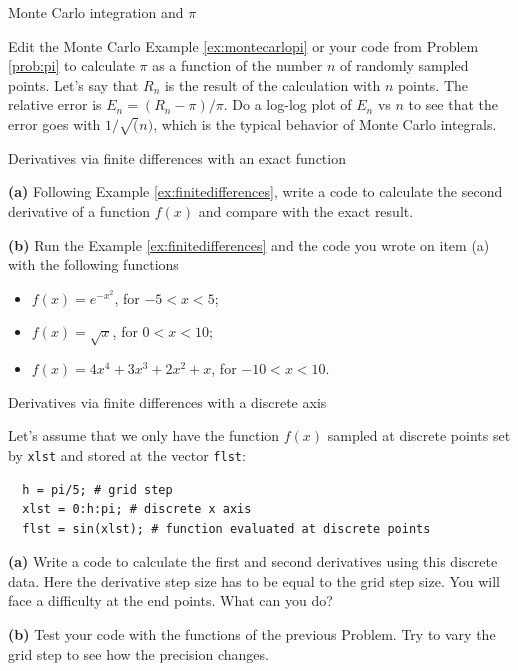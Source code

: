 \begin{problem}{Monte Carlo integration and $\pi$}
 \label{prob:montecarlopi}

Edit the Monte Carlo Example \ref{ex:montecarlopi} or your code from Problem \ref{prob:pi} to calculate $\pi$ as a function of the number $n$ of randomly sampled points. Let's say that $R_n$ is the result of the calculation with $n$ points. The relative error is $E_n = (R_n-\pi)/\pi$. Do a log-log plot of $E_n$ vs $n$ to see that the error goes with $1/\sqrt(n)$, which is the typical behavior of Monte Carlo integrals.
\end{problem}

\begin{problem}{Derivatives via finite differences with an exact function}
 \label{prob:finitediff}

 \textbf{(a)} Following Example \ref{ex:finitedifferences}, write a code to calculate the second derivative of a function $f(x)$ and compare with the exact result.
 
 \textbf{(b)} Run the Example \ref{ex:finitedifferences} and the code you wrote on item (a) with the following functions
 
 \begin{itemize}
  \item $f(x) = e^{-x^2}$, for $-5 < x < 5$;
  \item $f(x) = \sqrt{x}$, for $0 < x < 10$;
  \item $f(x) = 4x^4 + 3x^3 + 2x^2 + x$, for $-10 < x < 10$.
 \end{itemize}
\end{problem}


\begin{problem}{Derivatives via finite differences with a discrete axis}
 \label{prob:finitediff2}

 Let's assume that we only have the function $f(x)$ sampled at discrete points set by \texttt{xlst} and stored at the vector \texttt{flst}:
 
 \begin{verbatim}
  h = pi/5; # grid step
  xlst = 0:h:pi; # discrete x axis
  flst = sin(xlst); # function evaluated at discrete points
 \end{verbatim}

 \textbf{(a)} Write a code to calculate the first and second derivatives using this discrete data. Here the derivative step size has to be equal to the grid step size. You will face a difficulty at the end points. What can you do?
 
 \textbf{(b)} Test your code with the functions of the previous Problem. Try to vary the grid step to see how the precision changes.

\end{problem}


